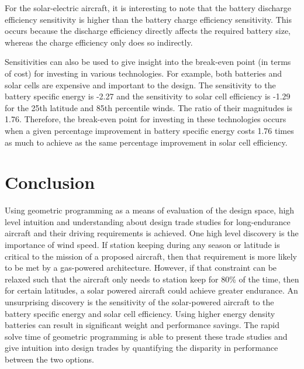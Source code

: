 For the solar-electric aircraft, it is interesting to note that the battery discharge efficiency sensitivity is higher than the battery charge efficiency sensitivity.
This occurs because the discharge efficiency directly affects the required battery size, whereas the charge efficiency only does so indirectly. 

Sensitivities can also be used to give insight into the break-even point (in terms of cost) for investing in various technologies.  
For example, both batteries and solar cells are expensive and important to the design.  
The sensitivity to the battery specific energy is -2.27 and the sensitivity to solar cell efficiency is -1.29 for the 25th latitude and 85th percentile winds. 
The ratio of their magnitudes is 1.76.  
Therefore, the break-even point for investing in these technologies occurs when a given percentage improvement in battery specific energy costs 1.76 times as much to achieve as the same percentage improvement in solar cell efficiency. 





\section{Conclusion}

Using geometric programming as a means of evaluation of the design space, high level intuition and understanding about design trade studies for long-endurance aircraft and their driving requirements is achieved.  
One high level discovery is the importance of wind speed.  
If station keeping during any season or latitude is critical to the mission of a proposed aircraft, then that requirement is more likely to be met by a gas-powered architecture.
However, if that constraint can be relaxed such that the aircraft only needs to station keep for 80\% of the time, then for certain latitudes, a solar powered aircraft could achieve greater endurance.
An unsurprising discovery is the sensitivity of the solar-powered aircraft to the battery specific energy and solar cell efficiency.  Using higher energy density batteries can result in significant weight and performance savings.  
The rapid solve time of geometric programming is able to present these trade studies and give intuition into design trades by quantifying the disparity in performance between the two options.





